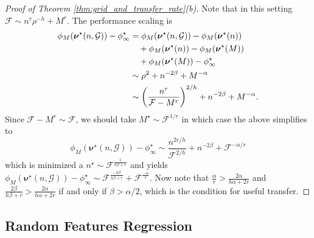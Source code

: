 \documentclass{article} %
\newcommand{\bhp}{\bm{\nu}}                       %
\newcommand{\grid}{\mathcal{G}}                   %
\newcommand{\compexp}{r}
\newcommand{\gridres}{\rho}                       %
\newcommand{\numhps}{h}
\newcommand{\flops}{\mathcal{F}}
\begin{document}
\begin{proof}[Proof of Theorem \ref{thm:grid_and_transfer_rate}(b)]
    Note that in this setting $\flops \sim n^\compexp \gridres^{-\numhps} + M^\compexp$. The performance scaling is
    \begin{align*}
        \phi_M(\bhp^\star(n, \grid)) - \phi_\infty^\star &= \phi_M(\bhp^\star(n, \grid)) - \phi_M(\bhp^\star(n))\\ 
        &\quad+ \phi_M(\bhp^\star(n)) - \phi_M(\bhp^\star(M))\\ 
        &\quad+ \phi_M(\bhp^\star(M)) - \phi_\infty^\star\\ 
        &\sim \rho^{2} + n^{-2\beta} + M^{-\alpha}\\
        &\sim \qty(\frac{n^\compexp}{\flops - M^\compexp})^{2/\numhps} + n^{-2\beta} + M^{-\alpha}.
    \end{align*}
    Since $\flops - M^r \sim \flops$, we should take $M^\star \sim \flops^{1/\compexp}$ in which case the above simplifies to
    \[
        \phi_M(\bhp^\star(n, \grid)) - \phi_\infty^\star \sim \frac{n^{2\compexp / \numhps}}{\flops^{2 / \numhps}}  + n^{-2\beta} + \flops^{-\alpha/r}
    \]
    which is minimized a $n^\star \sim \flops^{\frac{1}{\numhps \beta + \compexp}}$ and yields $ \phi_M(\bhp^\star(n, \grid)) - \phi_\infty^\star \sim \flops^{\frac{-2 \beta}{\numhps \beta + \compexp}} + \flops^{\frac{-\alpha}{\compexp}}$. Now note that $\frac{\alpha}{\compexp} > \frac{2 \alpha}{\numhps \alpha + 2 \compexp}$ and $\frac{2 \beta}{\numhps \beta + \compexp} > \frac{2\alpha}{\numhps \alpha + 2 \compexp}$ if and only if $\beta > \alpha / 2$, which is the condition for useful transfer.
\end{proof}

\bigskip

\subsection{Random Features Regression}
\label{app:rf-regression}
\end{document}
